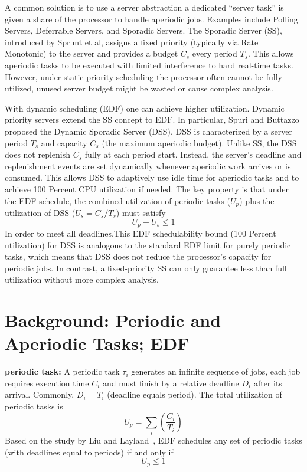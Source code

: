 \documentclass[conference]{IEEEtran}
\begin{document}
A common solution is to use a server abstraction a dedicated “server task” is given a share of the processor to handle aperiodic jobs. Examples include Polling Servers, Deferrable Servers, and Sporadic Servers. The Sporadic Server (SS), introduced by Sprunt et al\cite{sprunt1989aperiodic}, assigns a fixed priority (typically via Rate Monotonic) to the server and provides a budget $C_s$ every period $T_s$. This allows aperiodic tasks to be executed with limited interference to hard real-time tasks. However, under static-priority scheduling the processor often cannot be fully utilized, unused server budget might be wasted or cause complex analysis. 

With dynamic scheduling (EDF) one can achieve higher utilization. Dynamic priority servers extend the SS concept to EDF. In particular, Spuri and Buttazzo proposed the Dynamic Sporadic Server (DSS)\cite{spuri1994efficient}. DSS is characterized by a server period $T_s$ and capacity $C_s$ (the maximum aperiodic budget)\cite{buttazzo2011hard}. Unlike SS, the DSS does not replenish $C_s$ fully at each period start. Instead, the server’s deadline and replenishment events are set dynamically whenever aperiodic work arrives or is consumed\cite{spuri1994efficient}. This allows DSS to adaptively use idle time for aperiodic tasks and to achieve 100 Percent CPU utilization if needed. The key property is that under the EDF schedule, the combined utilization of periodic tasks ($U_p$) plus the utilization of DSS ($U_s = C_s/T_s$) must satisfy \[
U_p + U_s \leq 1
\]
In order to meet all deadlines\cite{spuri1994efficient}.This EDF schedulability bound (100 Percent utilization) for DSS is analogous to the standard EDF limit for purely periodic tasks, which means that DSS does not reduce the processor’s capacity for periodic jobs. In contrast, a fixed-priority SS can only guarantee less than full utilization without more complex analysis\cite{spuri1994efficient}.

\section{Background: Periodic and Aperiodic Tasks; EDF}

\textbf{periodic task:} A periodic task $\tau_i$ generates an infinite sequence of jobs, each job requires execution time $C_i$ and must finish by a relative deadline $D_i$ after its arrival. Commonly, $D_i = T_i$ (deadline equals period). The total utilization of periodic tasks is 
\[
U_p = \sum_i \left( \frac{C_i}{T_i} \right)
\]
Based on the study by Liu and Layland~\cite{liu1973scheduling}, EDF schedules any set of periodic tasks (with deadlines equal to periods) if and only if 
\[
U_p \leq 1
\]
\end{document}
